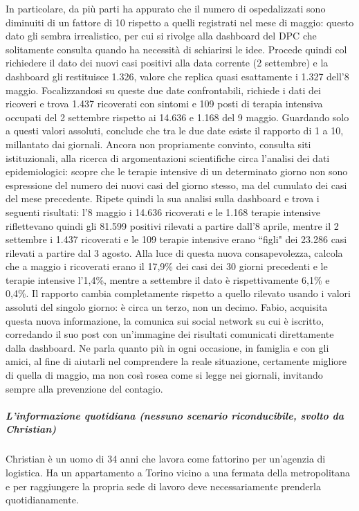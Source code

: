 In particolare, da più parti ha appurato che il numero di ospedalizzati sono diminuiti di un fattore di 10 rispetto a quelli registrati nel mese di maggio: questo dato gli sembra irrealistico, per cui si rivolge alla dashboard del DPC che solitamente consulta quando ha necessità di schiarirsi le idee.
Procede quindi col richiedere il dato dei nuovi casi positivi alla data corrente (2 settembre) e la dashboard gli restituisce 1.326, valore che replica quasi esattamente i 1.327 dell'8 maggio.
Focalizzandosi su queste due date confrontabili, richiede i dati dei ricoveri e trova 1.437 ricoverati con sintomi e 109 posti di terapia intensiva occupati del 2 settembre rispetto ai 14.636 e 1.168 del 9 maggio.
Guardando solo a questi valori assoluti, conclude che tra le due date esiste il rapporto di 1 a 10, millantato dai giornali.
Ancora non propriamente convinto, consulta siti istituzionali, alla ricerca di argomentazioni scientifiche circa l'analisi dei dati epidemiologici: scopre che le terapie intensive di un determinato giorno non sono espressione del numero dei nuovi casi del giorno stesso, ma del cumulato dei casi del mese precedente.
Ripete quindi la sua analisi sulla dashboard e trova i seguenti risultati: l'8 maggio i 14.636 ricoverati e le 1.168 terapie intensive riflettevano quindi gli 81.599 positivi rilevati a partire dall'8 aprile, mentre il 2 settembre i 1.437 ricoverati e le 109 terapie intensive erano ``figli" dei 23.286 casi rilevati a partire dal 3 agosto.
Alla luce di questa nuova consapevolezza, calcola che a maggio i ricoverati erano il 17,9\% dei casi dei 30 giorni precedenti e le terapie intensive l'1,4\%, mentre a settembre il dato è rispettivamente 6,1\% e 0,4\%.
Il rapporto cambia completamente rispetto a quello rilevato usando i valori assoluti del singolo giorno: è circa un terzo, non un decimo.
Fabio, acquisita questa nuova informazione, la comunica sui social network su cui è iscritto, corredando il suo post con un'immagine dei risultati comunicati direttamente dalla dashboard.
Ne parla quanto più in ogni occasione, in famiglia e con gli amici, al fine di aiutarli nel comprendere la reale situazione, certamente migliore di quella di maggio, ma non così rosea come si legge nei giornali, invitando sempre alla prevenzione del contagio.
\noindent
\subparagraph{L'informazione quotidiana (nessuno scenario riconducibile, svolto da Christian)}
Christian è un uomo di 34 anni che lavora come fattorino per un'agenzia di logistica.
Ha un appartamento a Torino vicino a una fermata della metropolitana e per raggiungere la propria sede di lavoro deve necessariamente prenderla quotidianamente.\\
